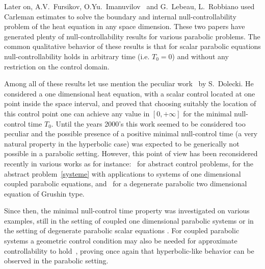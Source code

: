 Later on, A.V.~Fursikov, O.Yu.~Imanuvilov~\cite{FursikovImanuvilov96} and G.~Lebeau, L.~Robbiano \cite{LebeauRobbiano95} used Carleman estimates to solve the boundary and internal null-controllab\-ility problem of the heat equation in any space dimension. These two papers have generated plenty of null-controllability results for various parabolic problems. The common qualitative behavior of these results is that for scalar parabolic equations null-controllability holds in arbitrary time (i.e. $T_0 = 0$) and without any restriction on the control domain.

Among all of these results let use mention the peculiar work~\cite{Dolecki73} by S.~Dolecki. He considered a one dimensional heat equation, with a scalar control located at one point inside the space interval, and proved that choosing suitably the location of this control point one can achieve any value in $[0,+\infty]$ for the minimal null-control time $T_0$. Until the years 2000's this work seemed to be considered too peculiar and the possible presence of a positive minimal null-control time (a very natural property in the hyperbolic case) was expected to be generically not possible in a parabolic setting. However, this point of view has been reconsidered recently in various works as for instance:~\cite{AKBDK05} for abstract control problems, \cite{AmmarKhodjaBenabdallahGonzalez-BurgosdeTeresa:2014} for the abstract problem~\eqref{systeme} with applications to systems of one dimensional coupled parabolic equations, and~\cite{BeauchardCannarsaGuglielmi} for a degenerate parabolic two dimensional equation of Grushin type.

Since then, the minimal null-control time property was investigated on various examples, still in the setting of coupled one dimensional parabolic systems \cite{AKBGBdT_JMAA16,Duprez_Tmin2017,Ouaili18,Samb18} or in the setting of degenerate parabolic scalar equations \cite{BeauchardCannarsa17, BeauchardDardeErvedoza, BHHR_Kolmogorov, BeauchardMillerMorancey_Tmin, DuprezKoenig}. For coupled parabolic systems a geometric control condition may also be needed for approximate controllability to hold~\cite{BoyerOlive14, Olive13}, proving once again that hyperbolic-like behavior can be observed in the parabolic setting.

